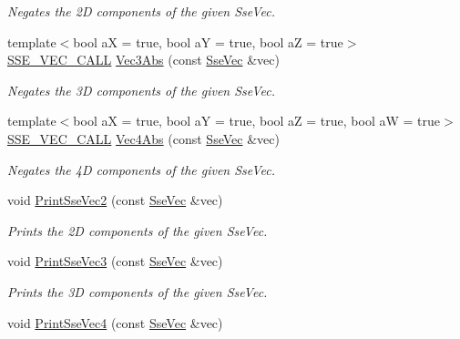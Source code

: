 \begin{DoxyCompactItemize}
\begin{DoxyCompactList}\small\item\em Negates the 2\+D components of the given Sse\+Vec. \end{DoxyCompactList}\item 
{\footnotesize template$<$bool a\+X = true, bool a\+Y = true, bool a\+Z = true$>$ }\\\hyperlink{ssevec__math__defs_8h_a97454f977a5281455cecacce1e8ba670}{S\+S\+E\+\_\+\+V\+E\+C\+\_\+\+C\+A\+L\+L} \hyperlink{group___s_i_m_d_vec_math_ga1f45f197fce5608d21164e08c5326d37}{Vec3\+Abs} (const \hyperlink{namespacegfxmath_a0de2243e2b8d0fd46d3af5e036423004}{Sse\+Vec} \&vec)
\begin{DoxyCompactList}\small\item\em Negates the 3\+D components of the given Sse\+Vec. \end{DoxyCompactList}\item 
{\footnotesize template$<$bool a\+X = true, bool a\+Y = true, bool a\+Z = true, bool a\+W = true$>$ }\\\hyperlink{ssevec__math__defs_8h_a97454f977a5281455cecacce1e8ba670}{S\+S\+E\+\_\+\+V\+E\+C\+\_\+\+C\+A\+L\+L} \hyperlink{group___s_i_m_d_vec_math_gae5cfd33c74124750dcaf8686047ea844}{Vec4\+Abs} (const \hyperlink{namespacegfxmath_a0de2243e2b8d0fd46d3af5e036423004}{Sse\+Vec} \&vec)
\begin{DoxyCompactList}\small\item\em Negates the 4\+D components of the given Sse\+Vec. \end{DoxyCompactList}\item 
void \hyperlink{group___s_i_m_d_vec_math_ga6592d0016a0d95f626c9e4d4b631482e}{Print\+Sse\+Vec2} (const \hyperlink{namespacegfxmath_a0de2243e2b8d0fd46d3af5e036423004}{Sse\+Vec} \&vec)
\begin{DoxyCompactList}\small\item\em Prints the 2\+D components of the given Sse\+Vec. \end{DoxyCompactList}\item 
void \hyperlink{group___s_i_m_d_vec_math_gad7ed787380ff739ec4b0e318bdbe8c0d}{Print\+Sse\+Vec3} (const \hyperlink{namespacegfxmath_a0de2243e2b8d0fd46d3af5e036423004}{Sse\+Vec} \&vec)
\begin{DoxyCompactList}\small\item\em Prints the 3\+D components of the given Sse\+Vec. \end{DoxyCompactList}\item 
void \hyperlink{group___s_i_m_d_vec_math_ga309d3f35d42b346865e1e1ff54575405}{Print\+Sse\+Vec4} (const \hyperlink{namespacegfxmath_a0de2243e2b8d0fd46d3af5e036423004}{Sse\+Vec} \&vec)

\end{DoxyCompactItemize}
